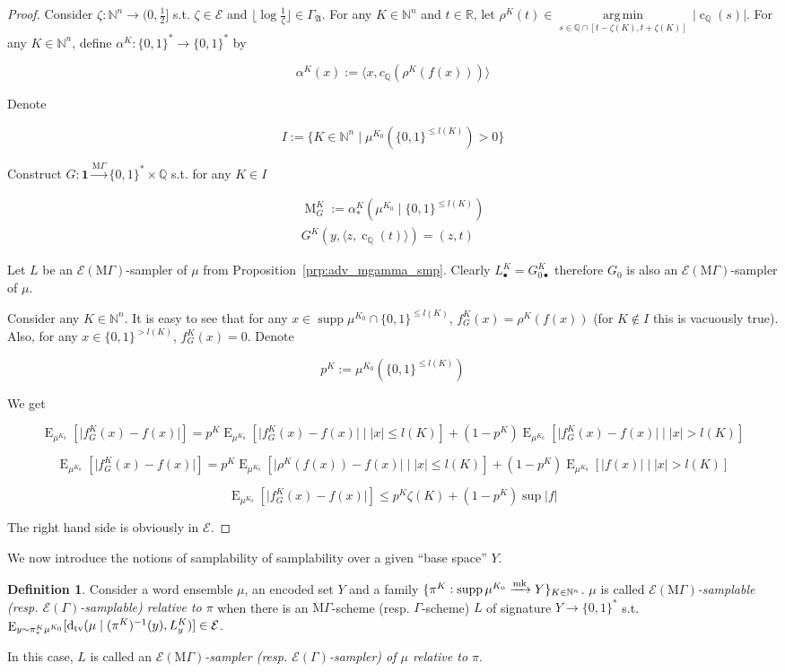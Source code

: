 \documentclass{article}
\numberwithin{equation}{section}
\theoremstyle{definition}
\newtheorem{definition}{Definition}[section]
\theoremstyle{plain}
\newcommand{\Bool}{\{0,1\}}
\newcommand{\Words}{{\Bool^*}}
\DeclareMathOperator{\Supp}{supp}
\DeclareMathOperator{\E}{E}
\DeclareMathOperator{\M}{M}
\DeclareMathOperator{\En}{c}
\newcommand{\Dtv}{\operatorname{d}_{\textnormal{tv}}}
\newcommand{\Argmin}[1]{\underset{#1}{\operatorname{arg\,min}}\,}
\newcommand{\Nats}{\mathbb{N}}
\newcommand{\Rats}{\mathbb{Q}}
\newcommand{\Reals}{\mathbb{R}}
\newcommand{\Abs}[1]{\lvert #1 \rvert}
\newcommand{\Floor}[1]{\lfloor #1 \rfloor}
\newcommand{\Chev}[1]{\langle #1 \rangle}
\newcommand{\GrowA}{\Gamma_{\mathfrak{A}}}
\newcommand{\MGrow}{\mathrm{M}\Gamma}
\newcommand{\Fall}{\mathcal{E}}
\newcommand{\EG}{\Fall(\Gamma)}
\newcommand{\EMG}{\Fall(\MGrow)}
\newcommand{\Markov}{\xrightarrow{\textnormal{mk}}}
\newcommand{\MScheme}{\xrightarrow{\MGrow}}
\begin{document}
\begin{proof}

Consider $\zeta: \Nats^n \rightarrow (0,\frac{1}{2}]$ s.t.  $\zeta \in \Fall$ and $\Floor{\log \frac{1}{\zeta}} \in \GrowA$. For any $K \in \Nats^n$ and ${t \in \Reals}$, let ${\rho^K(t) \in \Argmin{s \in \Rats \cap [t-\zeta(K),t+\zeta(K)]} \Abs{\En_\Rats(s)}}$. For any $K \in \Nats^n$, define ${\alpha^K: \Words \rightarrow \Words}$ by 

\[\alpha^K(x):=\Chev{x,c_\Rats(\rho^K(f(x)))}\]

Denote 

\[I:=\{K \in \Nats^n \mid \mu^{K_0}(\Bool^{\leq l(K)}) > 0\}\]

Construct ${G: \bm{1} \MScheme \Words \times \Rats}$ s.t. for any $K \in I$

\begin{align*}
\M_G^K:=\alpha_*^K(\mu^{K_0} \mid \Bool^{\leq l(K)}) \\
G^K(y,\Chev{z,\En_\Rats(t)})=(z,t)
\end{align*}

Let $L$ be an $\EMG$-sampler of $\mu$ from Proposition~\ref{prp:adv_mgamma_smp}. Clearly $L_{\bullet}^K=G_{0\bullet}^K$ therefore $G_0$ is also an $\EMG$-sampler of $\mu$.

Consider any $K \in \Nats^n$. It is easy to see that for any ${x \in \Supp \mu^{K_0} \cap \Bool^{\leq l(K)}}$, ${f_G^K(x)=\rho^K(f(x))}$ (for $K \not\in I$ this is vacuously true). Also, for any ${x \in \Bool^{>l(K)}}$, $f_G^K(x)=0$. Denote 

\[p^K:=\mu^{K_0}(\Bool^{\leq l(K)})\]

We get

$$\E_{\mu^{K_0}}[\Abs{f_G^K(x)-f(x)}]=p^K \E_{\mu^{K_0}}[\Abs{f_G^K(x)-f(x)} \mid \Abs{x} \leq l(K)] + (1 - p^K)\E_{\mu^{K_0}}[\Abs{f_G^K(x)-f(x)} \mid \Abs{x} > l(K)]$$

$$\E_{\mu^{K_0}}[\Abs{f_G^K(x)-f(x)}]=p^K \E_{\mu^{K_0}}[\Abs{\rho^K(f(x))-f(x)} \mid \Abs{x} \leq l(K)] + (1 - p^K)\E_{\mu^{K_0}}[\Abs{f(x)} \mid \Abs{x} > l(K)]$$

$$\E_{\mu^{K_0}}[\Abs{f_G^K(x)-f(x)}] \leq p^K \zeta(K) + (1 - p^K)\sup \Abs{f}$$

The right hand side is obviously in $\Fall$.
\end{proof}

We now introduce the notions of samplability of samplability over a given \enquote{base space} $Y$.

\begin{definition}

Consider a word ensemble $\mu$, an encoded set $Y$ and a family ${\{\pi^K: \Supp \mu^{K_0} \Markov Y\}_{K \in \Nats^n}}$. $\mu$ is called \emph{$\EMG$-samplable (resp. $\EG$-samplable) relative to $\pi$} when there is an $\MGrow$-scheme (resp. $\Gamma$-scheme) $L$ of signature $Y \rightarrow \Words$ s.t. ${\E_{y \sim \pi_*^K\mu^{K_0}}[\Dtv(\mu \mid (\pi^K)^{-1}(y),L_y^K)] \in \Fall}$.

In this case, $L$ is called an \emph{$\EMG$-sampler (resp. $\EG$-sampler) of $\mu$ relative to $\pi$}.

\end{definition}
\end{document}

